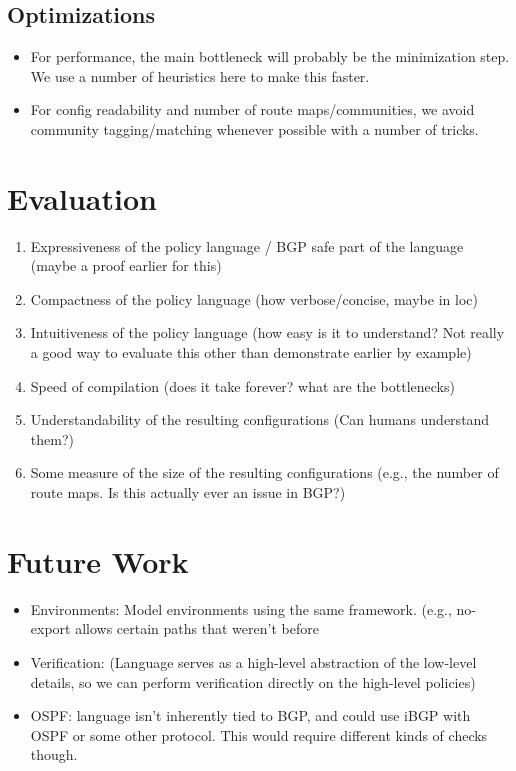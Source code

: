 \documentclass{paper}
\begin{document}
\subsection{Optimizations}

\begin{itemize}
	\item For performance, the main bottleneck will probably be the minimization step. We use a number of heuristics here to make this faster.
	\item For config readability and number of route maps/communities, we avoid community tagging/matching whenever possible with a number of tricks.
\end{itemize}



\section{Evaluation}

\begin{enumerate}
	\item Expressiveness of the policy language / BGP safe part of the language (maybe a proof earlier for this)
	\item Compactness of the policy language (how verbose/concise, maybe in loc)
	\item Intuitiveness of the policy language (how easy is it to understand? Not really a good way to evaluate this other than demonstrate earlier by example)
	\item Speed of compilation (does it take forever? what are the bottlenecks)
	\item Understandability of the resulting configurations (Can humans understand them?)
	\item Some measure of the size of the resulting configurations (e.g., the number of route maps. Is this actually ever an issue in BGP?)
\end{enumerate}


\section{Future Work}

\begin{itemize}
	\item Environments: Model environments using the same framework. (e.g., no-export allows certain paths that weren't before
	\item Verification: (Language serves as a high-level abstraction of the low-level details, so we can perform verification directly on the high-level policies)
	\item OSPF: language isn't inherently tied to BGP, and could use iBGP with OSPF or some other protocol. This would require different kinds of checks though.
\end{itemize}
\end{document}
